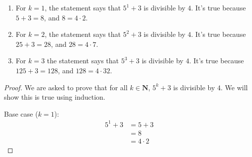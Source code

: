 \documentclass[12pt,oneside]{amsart}
\theoremstyle{remark}
\newcommand{\bfN}{\mathbf{N}}
\begin{document}
\begin{enumerate}
\item For $k=1$, the statement says that $5^1+3$ is divisible by $4$.
It's true because $5+3=8$, and $8 = 4 \cdot 2$.
\item For $k = 2$, the statement says that $5^2 + 3$ is divisible by $4$. It's true because $25 + 3 = 28$, and $28 = 4 \cdot 7$.
\item For $k = 3$ the statement says that $5^3 + 3$ is divisible by $4$. It's true because $125 + 3 = 128$, and $128 = 4 \cdot 32$.
\end{enumerate}
\begin{proof}
We are asked to prove that for all $k \in \bfN$, $5^k + 3$ is divisible by $4$. We will show this is true using induction.

Base case ($k = 1$):
\begin{align*}
5^1 + 3 &= 5 + 3 \\
          &= 8 \\
          &= 4 \cdot 2
\end{align*}


\end{proof}
\end{document}
